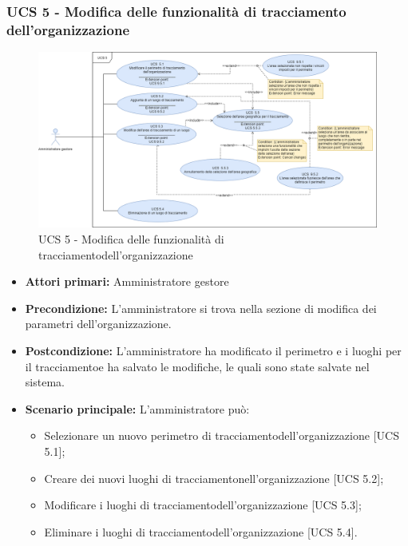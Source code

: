 \subsubsection{UCS 5 - Modifica delle funzionalità di tracciamento dell'organizzazione}%
\begin{figure}[h]
	\centering
    \includegraphics[scale=0.40]{sezioni/UseCase/Immagini/UCS5.png}
    \caption{UCS 5 - Modifica delle funzionalità di tracciamentodell'organizzazione}
\end{figure}
\begin{itemize}
    \item \textbf{Attori primari:} Amministratore gestore
    \item \textbf{Precondizione:} L'amministratore si trova nella sezione di modifica dei parametri dell'organizzazione.
    \item \textbf{Postcondizione:} L'amministratore ha modificato il perimetro e i luoghi per il tracciamentoe ha salvato le modifiche, le quali sono state salvate nel sistema.
    \item \textbf{Scenario principale:} L'amministratore può:
    \begin{itemize}    
        \item Selezionare un nuovo perimetro di tracciamentodell'organizzazione [UCS 5.1];
        \item Creare dei nuovi luoghi di tracciamentonell'organizzazione [UCS 5.2];
        \item Modificare i luoghi di tracciamentodell'organizzazione [UCS 5.3];
        \item Eliminare i luoghi di tracciamentodell'organizzazione [UCS 5.4].
    \end{itemize}
\end{itemize}

